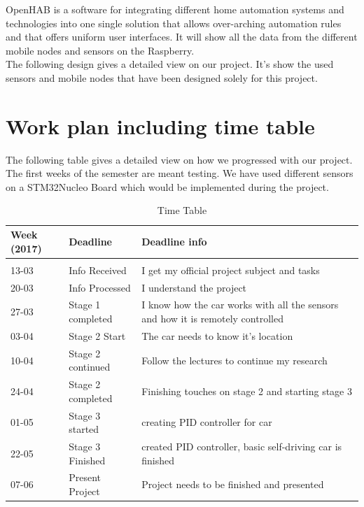 \documentclass[a4paper,notitlepage]{article}
\begin{document}
OpenHAB is a software for integrating different home automation systems and technologies into one single solution that allows over-arching automation rules and that offers uniform user interfaces. It will show all the data from the different mobile nodes and sensors on the Raspberry.\\

The following design gives a detailed view on our project. It's show the used sensors and mobile nodes that have been designed solely for this project.

\section*{Work plan including time table}

The following table gives a detailed view on how we progressed with our project. The first weeks of the semester are meant testing. We have used different sensors on a STM32Nucleo Board which would be implemented during the project.

\begin{table}[h]
\centering
\begin{tabular}{ l | p{3cm} | p{6cm} }
	
	{\bf{Week (2017)}} & {\bf{Deadline}} & {\bf{Deadline info}} \\
	\hline
	&&\\
	13-03 & Info Received & I get my official project subject and tasks \\
	20-03 & Info Processed & I understand the project \\
	27-03 & Stage 1 completed & I know how the car works with all the sensors and how it is remotely controlled \\
	03-04 & Stage 2 Start & The car needs to know it's location\\
	10-04 & Stage 2 continued & Follow the lectures to continue my research\\
	24-04 & Stage 2 completed & Finishing touches on stage 2 and starting stage 3\\
	01-05 & Stage 3 started & creating PID controller for car\\
	22-05 & Stage 3 Finished & created PID controller, basic self-driving car is finished\\ 
	07-06 & Present Project & Project needs to be finished and presented\\
\end{tabular}
\caption{Time Table}
\end{table}
\end{document}
